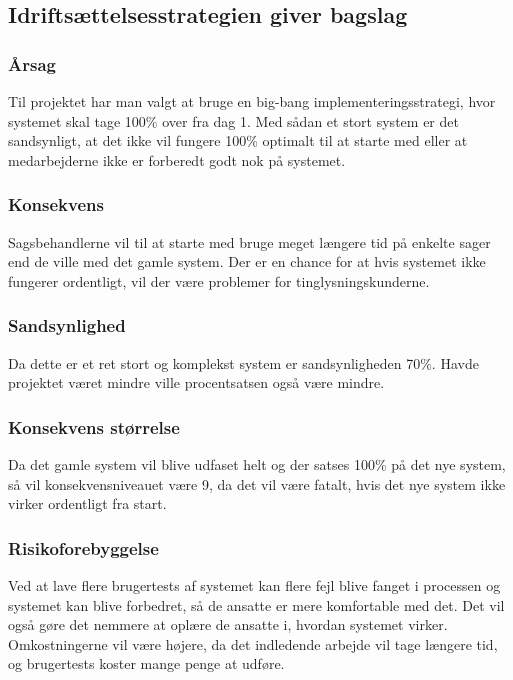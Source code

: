 \documentclass[10pt,a4paper,danish]{article}
\begin{document}






\subsection{Idriftsættelsesstrategien giver bagslag}
\subsubsection{Årsag}
Til projektet har man valgt at bruge en big-bang implementeringsstrategi, hvor systemet skal tage 100\% over fra dag 1.
Med sådan et stort system er det sandsynligt, at det ikke vil fungere 100\% optimalt til at starte med eller at medarbejderne ikke er forberedt godt nok på systemet. 

\subsubsection{Konsekvens}
Sagsbehandlerne vil til at starte med bruge meget længere tid på enkelte sager end de ville med det gamle system. Der er en chance for at hvis systemet ikke fungerer ordentligt, vil der være problemer for tinglysningskunderne.

\subsubsection{Sandsynlighed}
Da dette er et ret stort og komplekst system er sandsynligheden 70\%. Havde projektet været mindre ville procentsatsen også være mindre.

\subsubsection{Konsekvens størrelse}
Da det gamle system vil blive udfaset helt og der satses 100\% på det nye system, så vil konsekvensniveauet være 9, da det vil være fatalt, hvis det nye system ikke virker ordentligt fra start.

\subsubsection{Risikoforebyggelse}
Ved at lave flere brugertests af systemet kan flere fejl blive fanget i processen og systemet kan blive forbedret, så de ansatte er mere komfortable med det. Det vil også gøre det nemmere at oplære de ansatte i, hvordan systemet virker. Omkostningerne vil være højere, da det indledende arbejde vil tage længere tid, og brugertests koster mange penge at udføre.
\end{document}

